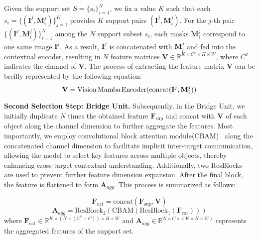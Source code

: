 Given the support set \({S} = \{ {s}_i \}_{i=1}^N\), we fix a value \(K\) such that each \({s}_i = \{ (\mathbf{I}^j, \mathbf{M}_i^j) \}_{j=1}^K\) provides \(K\) support pairs \((\mathbf{I}^j, \mathbf{M}_i^j)\). For the \(j\)-th pair \(\{ (\mathbf{I}^j, \mathbf{M}_i^j) \}_{i=1}^N\) among the \(N\) support subset \({s}_i\), each masks \(\mathbf{M}_i^j\) correspond to one same image \(\mathbf{I}^j\). As a result, \(\mathbf{I}^j\) is concatenated with \(\mathbf{M}_i^j\) and fed into the contextual encoder, resulting in \(N\) feature matrices \(\mathbf{V} \in \mathbb{R}^{K \times C^{v} \times H \times W}\), where \(C^{v}\) indicates the channel of \(\mathbf{V}\). The process of extracting the feature matrix \(\mathbf{V}\) can be breifly represented by the following equation:
\begin{equation}
\mathbf{V} = \text{Vision\,Mamba\,Encoder}(\text{concat}(\mathbf{I}^j, \mathbf{M}_i^j))
\end{equation}

{\bf Second Selection Step: Bridge Unit.} Subsequently, in the Bridge Unit, we initially duplicate \(N\) times the obtained feature \(\mathbf{F}_{\text{sup}}\) and concat with \(\mathbf{V}\) of each object along the channel dimension to further aggregate the features. Most importantly, we employ convolutional block attention module(CBAM)~\cite{woo2018cbam} along the concatenated channel dimension to facilitate implicit inter-target communication, allowing the model to select key features across multiple objects, thereby enhancing cross-target contextual understanding. Additionally, two ResBlocks ~\cite{he2016deep} are used to prevent further feature dimension expansion. After the final block, the feature is flattened to form \(\mathbf{A}_{agg}\). This process is summarized as follows:

\begin{equation}
\mathbf{F}_{\text{cat}} = \text{concat}(\mathbf{F}_{\text{sup}}, \mathbf{V})
\end{equation}
\begin{equation}
\mathbf{A}_{agg} = \text{ResBlock}_2(\text{CBAM}(\text{ResBlock}_1(\mathbf{F}_{\text{cat}})))
\end{equation}
where  \(\mathbf{F}_{\text{cat}} \in \mathbb{R}^{K \times (N \times (C^{v} + C)) \times H \times W}\) and \(\mathbf{A}_{agg} \in \mathbb{R}^{N \times C \times (K \times H \times  W)}\) represents the aggregated features of the support set.

